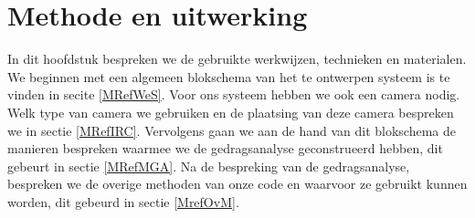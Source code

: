 \chapter{Methode en uitwerking}
\label{mRef}
In dit hoofdstuk bespreken we de gebruikte werkwijzen, technieken en materialen. We beginnen met een algemeen blokschema van het te ontwerpen systeem is te vinden in secite \ref{MRefWeS}. Voor ons systeem hebben we ook een camera nodig. Welk type van camera we gebruiken en de plaatsing van deze camera bespreken we in sectie \ref{MRefIRC}. Vervolgens gaan we aan de hand van dit blokschema de manieren bespreken waarmee we de gedragsanalyse geconstrueerd hebben, dit gebeurt in sectie \ref{MRefMGA}. Na de bespreking van de gedragsanalyse, bespreken we de overige methoden van onze code en waarvoor ze gebruikt kunnen worden, dit gebeurd in sectie \ref{MrefOvM}.

